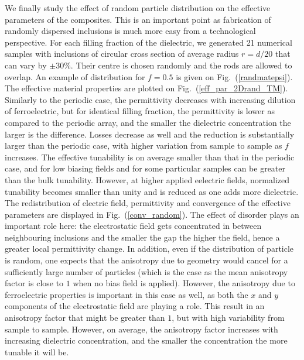 \documentclass[openacc]{rsproca_new}%
\newcommand{\fig}[1]{Fig.~(\ref{#1})}
\begin{document}
We finally study the effect of random particle distribution on the effective parameters of the
composites. This is an important point as fabrication of randomly dispersed
inclusions is much more easy from a technological perspective. For each filling fraction of the dielectric,
we generated 21 numerical samples with inclusions of circular cross section of average radius
$r=d/20$ that can vary by $\pm 30\%$. Their centre is chosen randomly and the
rods are allowed to overlap. An example of distribution for $f=0.5$ is given on \fig{randmatepsi}.
The effective material properties are plotted on \fig{eff_par_2Drand_TM}.
Similarly to the periodic case, the permittivity decreases with increasing dilution of
ferroelectric, but for identical filling fraction,
the permittivity is lower as compared to the periodic array, and the smaller the dielectric concentration the larger
is the difference. Losses decrease as well and the reduction is substantially larger
than the periodic case, with higher variation from sample to sample as $f$ increases.
The effective tunability is on average smaller than that in the periodic case, and
for low biasing fields and for some particular samples can be greater than the bulk tunability. However,
at higher applied eelectric fields, normalized tunability becomes smaller than unity and
is reduced as one adds more dielectric. \\
The redistribution of electric field, permittivity and convergence of
the effective parameters are displayed in \fig{conv_random}. The effect of
disorder plays an important role here: the electrostatic field gets concentrated
in between neighbouring inclusions and the smaller the gap the higher the field, hence
a greater local permittivity change. In addition, even if the distribution of particle is
random, one expects that the anisotropy due to geometry would cancel for a sufficiently large number
of particles (which is the case as the mean anisotropy factor is close to $1$ when no
bias field is applied). However, the anisotropy due to ferroelectric properties is
important in this case as well, as both the $x$ and $y$ components of the electrostatic field
are playing a role. This result in an anisotropy factor that might be greater than $1$,
but with high variability from sample to sample. However, on average, the anisotropy factor
increases with increasing dielectric concentration, and the smaller the concentration the more tunable
it will be.
\end{document}
